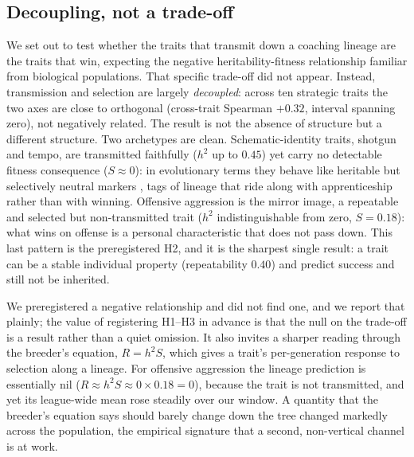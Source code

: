\documentclass[11pt]{article}
\begin{document}
\subsection{Decoupling, not a trade-off}
We set out to test whether the traits that transmit down a coaching lineage are the
traits that win, expecting the negative heritability-fitness relationship familiar
from biological populations. That specific trade-off did not appear. Instead,
transmission and selection are largely \emph{decoupled}: across ten strategic
traits the two axes are close to orthogonal (cross-trait Spearman $+0.32$, interval
spanning zero), not negatively related. The result is not the absence of structure
but a different structure. Two archetypes are clean. Schematic-identity traits,
shotgun and tempo, are transmitted faithfully ($h^{2}$ up to $0.45$) yet carry no
detectable fitness consequence ($S\approx0$): in evolutionary terms they behave
like heritable but selectively neutral markers \citep{kimura1968}, tags of lineage
that ride along with apprenticeship rather than with winning. Offensive aggression
is the mirror image, a repeatable and selected but non-transmitted trait ($h^{2}$
indistinguishable from zero, $S=0.18$): what wins on offense is a personal
characteristic that does not pass down. This last pattern is the preregistered H2,
and it is the sharpest single result: a trait can be a stable individual property
(repeatability $0.40$) and predict success and still not be inherited.

We preregistered a negative relationship and did not find one, and we report that
plainly; the value of registering H1--H3 in advance is that the null on the
trade-off is a result rather than a quiet omission. It also invites a sharper
reading through the breeder's equation, $R=h^{2}S$, which gives a trait's
per-generation response to selection along a lineage. For offensive aggression the
lineage prediction is essentially nil ($R\approx h^{2}S\approx 0\times 0.18=0$),
because the trait is not transmitted, and yet its league-wide mean rose steadily
over our window. A quantity that the breeder's equation says should barely change
down the tree changed markedly across the population, the empirical signature that a
second, non-vertical channel is at work.
\end{document}
